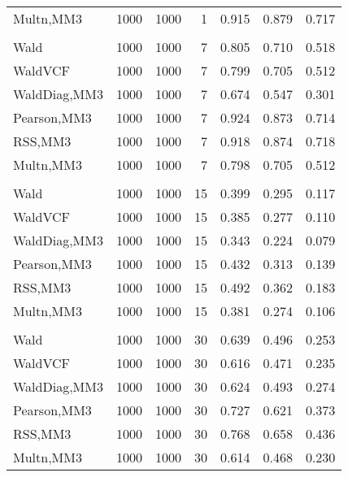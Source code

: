 \documentclass[
]{article}
\begin{document}
\begin{table}[H]
{\begin{tabular}[t]{lrrrrrr}
\hspace{1em}Multn,MM3 & 1000 & 1000 & 1 & 0.915 & 0.879 & 0.717\\
\addlinespace[0.3em]
\multicolumn{7}{l}{\textbf{1F 15V}}\\
\hspace{1em}Wald & 1000 & 1000 & 7 & 0.805 & 0.710 & 0.518\\
\hspace{1em}WaldVCF & 1000 & 1000 & 7 & 0.799 & 0.705 & 0.512\\
\hspace{1em}WaldDiag,MM3 & 1000 & 1000 & 7 & 0.674 & 0.547 & 0.301\\
\hspace{1em}Pearson,MM3 & 1000 & 1000 & 7 & 0.924 & 0.873 & 0.714\\
\hspace{1em}RSS,MM3 & 1000 & 1000 & 7 & 0.918 & 0.874 & 0.718\\
\hspace{1em}Multn,MM3 & 1000 & 1000 & 7 & 0.798 & 0.705 & 0.512\\
\addlinespace[0.3em]
\multicolumn{7}{l}{\textbf{2F 10V}}\\
\hspace{1em}Wald & 1000 & 1000 & 15 & 0.399 & 0.295 & 0.117\\
\hspace{1em}WaldVCF & 1000 & 1000 & 15 & 0.385 & 0.277 & 0.110\\
\hspace{1em}WaldDiag,MM3 & 1000 & 1000 & 15 & 0.343 & 0.224 & 0.079\\
\hspace{1em}Pearson,MM3 & 1000 & 1000 & 15 & 0.432 & 0.313 & 0.139\\
\hspace{1em}RSS,MM3 & 1000 & 1000 & 15 & 0.492 & 0.362 & 0.183\\
\hspace{1em}Multn,MM3 & 1000 & 1000 & 15 & 0.381 & 0.274 & 0.106\\
\addlinespace[0.3em]
\multicolumn{7}{l}{\textbf{3F 15V}}\\
\hspace{1em}Wald & 1000 & 1000 & 30 & 0.639 & 0.496 & 0.253\\
\hspace{1em}WaldVCF & 1000 & 1000 & 30 & 0.616 & 0.471 & 0.235\\
\hspace{1em}WaldDiag,MM3 & 1000 & 1000 & 30 & 0.624 & 0.493 & 0.274\\
\hspace{1em}Pearson,MM3 & 1000 & 1000 & 30 & 0.727 & 0.621 & 0.373\\
\hspace{1em}RSS,MM3 & 1000 & 1000 & 30 & 0.768 & 0.658 & 0.436\\
\hspace{1em}Multn,MM3 & 1000 & 1000 & 30 & 0.614 & 0.468 & 0.230\\
\bottomrule
\end{tabular}}
\endgroup{}
\end{table}
\end{document}
